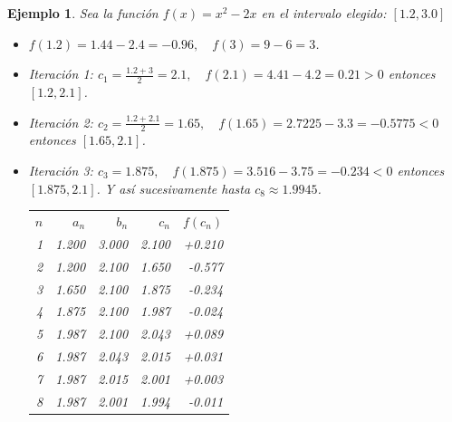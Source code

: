 \documentclass[12pt]{article}
\newtheorem{Ejem}{Ejemplo}%
\begin{document}
\begin{Ejem} Sea la función $f(x)=x^2-2x$ en el intervalo elegido: $[1.2,3.0]$  

\begin{itemize}
\item $f(1.2)=1.44-2.4=-0.96, \quad f(3)=9-6=3$.

\item Iteración 1: $c_1=\frac{1.2+3}{2}=2.1, \quad f(2.1)=4.41-4.2=0.21>0 $ entonces $[1.2,2.1]$.

\item Iteración 2: $c_2=\frac{1.2+2.1}{2}=1.65, \quad f(1.65)=2.7225-3.3=-0.5775<0 $ entonces $[1.65,2.1]$.

\item Iteración 3: $c_3=1.875, \quad f(1.875)=3.516-3.75=-0.234<0 $ entonces $[1.875,2.1]$. Y así sucesivamente hasta $c_8\approx1.9945$.

\begin{center}
\begin{tabular}{@{}rrrrr@{}}
$n$ & $a_n$ & $b_n$ & $c_n$ & $f(c_n)$ \\
1 & 1.200 & 3.000 & 2.100 & +0.210 \\
2 & 1.200 & 2.100 & 1.650 & -0.577 \\
3 & 1.650 & 2.100 & 1.875 & -0.234 \\
4 & 1.875 & 2.100 & 1.987 & -0.024 \\
5 & 1.987 & 2.100 & 2.043 & +0.089 \\
6 & 1.987 & 2.043 & 2.015 & +0.031 \\
7 & 1.987 & 2.015 & 2.001 & +0.003 \\
8 & 1.987 & 2.001 & 1.994 & -0.011 \\
\end{tabular}
\end{center}
\end{itemize}
\end{Ejem}
\end{document}
